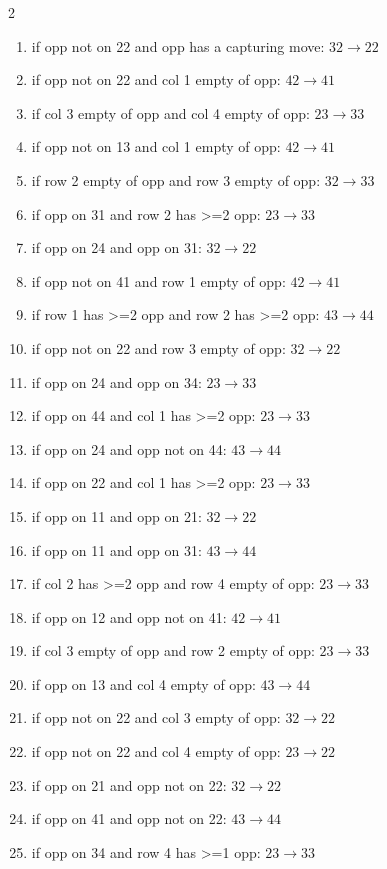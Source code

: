 \begin{multicols}{2}
\begin{tikzpicture}[scale=0.24]
\end{tikzpicture}
\nopagebreak\begin{enumerate}[topsep=1pt,itemsep=0pt,parsep=0pt,leftmargin=2.2em,label=\arabic*.]
\item if opp not on 22 and opp has a capturing move: $32\!\to\!22$
\item if opp not on 22 and col 1 empty of opp: $42\!\to\!41$
\item if col 3 empty of opp and col 4 empty of opp: $23\!\to\!33$
\item if opp not on 13 and col 1 empty of opp: $42\!\to\!41$
\item if row 2 empty of opp and row 3 empty of opp: $32\!\to\!33$
\item if opp on 31 and row 2 has >=2 opp: $23\!\to\!33$
\item if opp on 24 and opp on 31: $32\!\to\!22$
\item if opp not on 41 and row 1 empty of opp: $42\!\to\!41$
\item if row 1 has >=2 opp and row 2 has >=2 opp: $43\!\to\!44$
\item if opp not on 22 and row 3 empty of opp: $32\!\to\!22$
\item if opp on 24 and opp on 34: $23\!\to\!33$
\item if opp on 44 and col 1 has >=2 opp: $23\!\to\!33$
\item if opp on 24 and opp not on 44: $43\!\to\!44$
\item if opp on 22 and col 1 has >=2 opp: $23\!\to\!33$
\item if opp on 11 and opp on 21: $32\!\to\!22$
\item if opp on 11 and opp on 31: $43\!\to\!44$
\item if col 2 has >=2 opp and row 4 empty of opp: $23\!\to\!33$
\item if opp on 12 and opp not on 41: $42\!\to\!41$
\item if col 3 empty of opp and row 2 empty of opp: $23\!\to\!33$
\item if opp on 13 and col 4 empty of opp: $43\!\to\!44$
\item if opp not on 22 and col 3 empty of opp: $32\!\to\!22$
\item if opp not on 22 and col 4 empty of opp: $23\!\to\!22$
\item if opp on 21 and opp not on 22: $32\!\to\!22$
\item if opp on 41 and opp not on 22: $43\!\to\!44$
\item if opp on 34 and row 4 has >=1 opp: $23\!\to\!33$

\end{enumerate}
\end{multicols}
